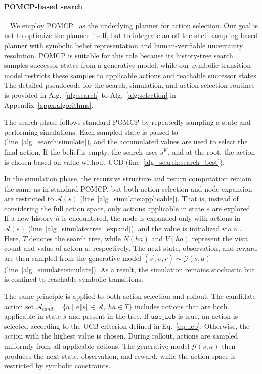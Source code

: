 \paragraph{POMCP-based search}~\label{methd:POMCP}
We employ POMCP~\cite{silver2010monte} as the underlying planner for action selection. Our goal is not to optimize the planner itself, but to integrate an off-the-shelf sampling-based planner with symbolic belief representation and human-verifiable uncertainty resolution. POMCP is suitable for this role because its history-tree search samples successor states from a generative model, while our symbolic transition model restricts these samples to applicable actions and reachable successor states. The detailed pseudocode for the search, simulation, and action-selection routines is provided in Alg.~\ref{alg:search} to Alg.~\ref{alg:selection} in Appendix~\ref{appx:algorithms}.


The search phase follows standard POMCP by repeatedly sampling a state and performing simulations. Each sampled state is passed to \Simulate (line~\ref{alg_search:simulate}), and the accumulated values are used to select the final action. If the belief is empty, the search uses $s^{K}$, and at the root, the action is chosen based on value without UCB (line~\ref{alg_search:search_best}).


In the simulation phase, the recursive structure and return computation remain the same as in standard POMCP, but both action selection and node expansion are restricted to $\mathcal{A}(s)$ (line~\ref{alg_simulate:applicable}). That is, instead of considering the full action space, only actions applicable in state $s$ are explored. If a new history $h$ is encountered, the node is expanded only with actions in $\mathcal{A}(s)$ (line~\ref{alg_simulate:tree_expand}), and the value is initialized via a \Rollout. Here, $T$ denotes the search tree, while $N(ha)$ and $V(ha)$ represent the visit count and value of action $a$, respectively. The next state, observation, and reward are then sampled from the generative model $(s^\prime, o, r) \sim \mathcal{G}(s,a)$ (line~\ref{alg_simulate:simulate}). As a result, the simulation remains stochastic but is confined to reachable symbolic transitions.


The same principle is applied to both action selection and rollout. The candidate action set $\mathcal{A}_{cand} = \{a \mid a\llbracket s \rrbracket \in \mathcal{A},\ ha \in T\}$ includes actions that are both applicable in state $s$ and present in the tree. If $\texttt{use\_ucb}$ is true, an action is selected according to the UCB criterion defined in Eq.~\ref{eq:ucb}. Otherwise, the action with the highest value is chosen. During rollout, actions are sampled uniformly from all applicable actions. The generative model $\mathcal{G}(s,a)$ then produces the next state, observation, and reward, while the action space is restricted by symbolic constraints.


